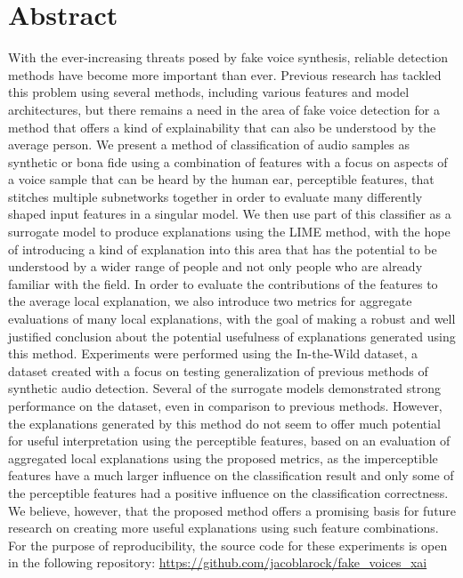 \documentclass{article}
\begin{document}
    \section{Abstract}
	With the ever-increasing threats posed by fake voice synthesis, reliable detection methods
	have become more important than ever. Previous research has tackled this problem using several
	methods, including various features and model architectures, but there remains a need in the
	area of fake voice detection for a method that offers a kind of explainability that can also
	be understood by the average person. We present a method of classification of audio samples as
	synthetic or bona fide using a combination of features with a focus on aspects of a voice
	sample that can be heard by the human ear, perceptible features, that stitches multiple
	subnetworks together in order to evaluate many differently shaped input features in a singular
	model. We then use part of this classifier as a surrogate model to produce explanations using
	the LIME method, with the hope of introducing a kind of explanation into this area that has
	the potential to be understood by a wider range of people and not only people who are already
	familiar with the field. In order to evaluate the contributions of the features to the average
	local explanation, we also introduce two metrics for aggregate evaluations of many local
	explanations, with the goal of making a robust and well justified conclusion about the
	potential usefulness of explanations generated using this method. Experiments were performed
	using the In-the-Wild dataset, a dataset created with a focus on testing generalization of
	previous methods of synthetic audio detection. Several of the surrogate models demonstrated
	strong performance on the dataset, even in comparison to previous methods. However, the
	explanations generated by this method do not seem to offer much potential for useful
	interpretation using the perceptible features, based on an evaluation of aggregated local
	explanations using the proposed metrics, as the imperceptible features have a much larger
	influence on the classification result and only some of the perceptible features had a
	positive influence on the classification correctness. We believe, however, that the proposed
	method offers a promising basis for future research on creating more useful explanations using
	such feature combinations. For the purpose of reproducibility, the source code for these
	experiments is open in the following repository:
	\url{https://github.com/jacoblarock/fake_voices_xai}
\end{document}
